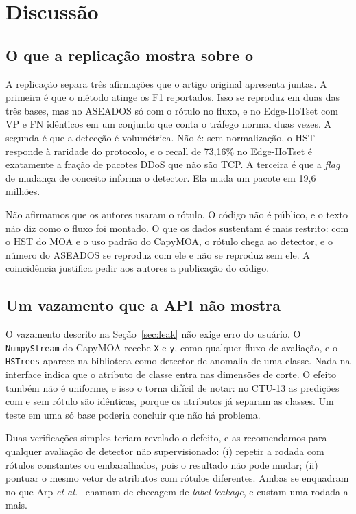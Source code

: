 \section{Discussão}
\label{sec:discussion}

\subsection{O que a replicação mostra sobre o \modus}
A replicação separa três afirmações que o artigo original apresenta juntas. A primeira é que o
método atinge os F1 reportados. Isso se reproduz em duas das três bases, mas no ASEADOS só com o
rótulo no fluxo, e no Edge-IIoTset com VP e FN idênticos em um conjunto que conta o tráfego normal
duas vezes. A segunda é que a detecção é volumétrica. Não é: sem normalização, o HST responde à
raridade do protocolo, e o recall de 73,16\% no Edge-IIoTset é exatamente a fração de pacotes DDoS
que não são TCP. A terceira é que a \emph{flag} de mudança de conceito informa o detector. Ela muda
um pacote em 19,6 milhões.

Não afirmamos que os autores usaram o rótulo. O código não é público, e o texto não diz como o
fluxo foi montado. O que os dados sustentam é mais restrito: com o HST do MOA e o uso padrão do
CapyMOA, o rótulo chega ao detector, e o número do ASEADOS se reproduz com ele e não se
reproduz sem ele. A coincidência justifica pedir aos autores a publicação do código.

\subsection{Um vazamento que a API não mostra}
O vazamento descrito na Seção~\ref{sec:leak} não exige erro do usuário. O \texttt{NumpyStream} do
CapyMOA recebe \texttt{X} e \texttt{y}, como qualquer fluxo de avaliação, e o \texttt{HSTrees}
aparece na biblioteca como detector de anomalia de uma classe. Nada na interface indica que o
atributo de classe entra nas dimensões de corte. O efeito também não é uniforme, e isso o torna
difícil de notar: no CTU-13 as predições com e sem rótulo são idênticas, porque os atributos já
separam as classes. Um teste em uma só base poderia concluir que não há problema.

Duas verificações simples teriam revelado o defeito, e as recomendamos para qualquer avaliação de
detector não supervisionado: (i) repetir a rodada com rótulos constantes ou embaralhados, pois o
resultado não pode mudar; (ii) pontuar o mesmo vetor de atributos com rótulos diferentes. Ambas se
enquadram no que Arp \emph{et al.}~\cite{arp2022dos} chamam de checagem de \emph{label leakage}, e
custam uma rodada a mais.

